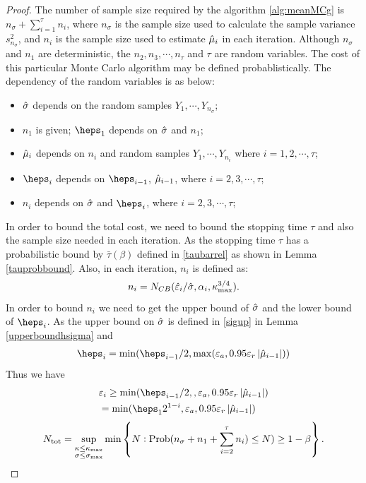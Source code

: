 \documentclass{iitthesis}
\begin{document}
\begin{proof}
The number of sample size required by the algorithm \ref{alg:meanMCg} is $n_{\sigma}+\sum_{i=1}^\tau n_i$, where $n_\sigma$ is the sample size used to calculate the sample variance $s_{n_\sigma}^2$, and $n_i$ is the sample size used to estimate $\hat{\mu}_i$ in each iteration.
 Although $n_{\sigma}$ and $n_1$ are deterministic, the $n_2, n_3,\cdots, n_\tau$ and $\tau$ are random variables. The cost of this particular Monte Carlo algorithm may be defined probablistically. The dependency of the random variables is as below:
 \begin{itemize}
 \item $\hat{\sigma}$ depends on the random samples $Y_1,\cdots, Y_{n_\sigma}$;
 \item $n_1$ is given; $\heps_1$ depends on $\hat{\sigma}$ and $n_1$; 
  \item $\hat{\mu}_i$ depends on $n_i$ and random samples $Y_1, \cdots, Y_{n_i}$ where $i = 1,2,\cdots,\tau$;
 \item $\heps_i$ depends on $\heps_{i-1}$, $\hat{\mu}_{i-1}$, where $i = 2,3,\cdots,\tau$;
 \item $n_i$ depends on  $\hat{\sigma}$ and $\heps_i$, where  $i = 2,3,\cdots,\tau$;
 \end{itemize}
 In order to bound the total cost, we need to bound the stopping time $\tau$ and also the sample size needed in each iteration. As the stopping time $\tau$ has a probabilistic bound by $\bar{\tau}(\beta)$ defined in \eqref{taubarrel} as shown in Lemma \eqref{tauprobbound}. Also, in each iteration, $n_i$ is defined as:
$$n_{i} = N_{CB}(\hat{\varepsilon}_{i}/\hat{\sigma},\alpha_{i},\kappa_{\max}^{3/4}).$$
In order to bound $n_i$ we need to get the upper bound of $\hat{\sigma}$ and the lower bound of $\heps_i$. As the upper bound on $\hat{\sigma}$ is defined in \eqref{sigup} in Lemma \ref{upperboundhsigma} and 
\begin{align}
\heps_i= \min(\heps_{i-1}/2, \max(\varepsilon_a,0.95\varepsilon_r\abs{\hmu_{i-1}}))
\end{align}
Thus we have 
\begin{align}
&\varepsilon_i \geq  \min(\heps_{i-1}/2,,\varepsilon_a,0.95\varepsilon_r\abs{\hmu_{i-1}})\\
& = \min(\heps_12^{1-i},\varepsilon_a,0.95\varepsilon_r\abs{\hmu_{i-1}})\\
\end{align}
\begin{equation*}
N_{\text{tot}} = \sup_{\substack{\kappa \le \kappa_{\max} \\ \sigma \le \sigma_{\max}}} \min\left\{N : \Prob(n_{\sigma} + n_1+\sum_{i=2}^\tau n_i) \le N) \ge 1-\beta  \right \}.

\end{equation*}
\end{proof}
\end{document}
